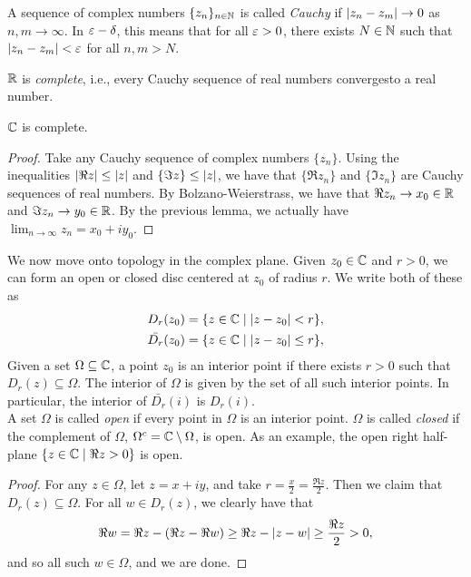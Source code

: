 \noindent A sequence of complex numbers $\{z_n\}_{n \in \mathbb N}$ is called \textit{Cauchy} if $\left\lvert z_n - z_m \right\rvert \to 0$ as $n, m \to \infty$. In $\varepsilon-\delta$, this means that for all $\varepsilon > 0$, there exists $N \in \mathbb N$ such that $\left\lvert z_n - z_m \right\rvert < \varepsilon$ for all $n, m > N$.
\begin{simplethm}
    $\mathbb R$ is \textit{complete}, i.e., every Cauchy sequence of real numbers convergesto a real number.
\end{simplethm}
\begin{simplethm}
    $\mathbb C$ is complete.
\end{simplethm}
\begin{proof}
    Take any Cauchy sequence of complex numbers $\{z_n\}$. Using the inequalities $\left\lvert \Re z \right\rvert \leq \left\lvert z \right\rvert$ and $\{\Im z\} \leq \left\lvert z \right\rvert$, we have that $\{\Re z_n\}$ and $\{\Im z_n\}$ are Cauchy sequences of real numbers. By Bolzano-Weierstrass, we have that $\Re z_n \to x_0 \in \mathbb R$ and $\Im z_n \to y_0 \in \mathbb R$. By the previous lemma, we actually have $\lim_{n \to \infty} z_n = x_0 + i y_0$.
\end{proof}
\noindent We now move onto topology in the complex plane. Given $z_0 \in \mathbb C$ and $r > 0$, we can form an open or closed disc centered at $z_0$ of radius $r$. We write both of these as
\begin{align*}
    D_r(z_0) &= \{z \in \mathbb C \mid \left\lvert z - z_0 \right\rvert < r\}, \\
    \bar{D_r}(z_0) &= \{z \in \mathbb C \mid \left\lvert z - z_0 \right\rvert \leq r\},
\end{align*}
Given a set $\Omega \subseteq \mathbb C$, a point $z_0$ is an interior point if there exists $r > 0$ such that $D_r(z) \subseteq \Omega$. The interior of $\Omega$ is given by the set of all such interior points. In particular, the interior of $\bar{D_r}(i)$ is $D_r(i)$.
\\[8pt]
A set $\Omega$ is called \textit{open} if every point in $\Omega$ is an interior point. $\Omega$ is called \textit{closed} if the complement of $\Omega$, $\Omega^c = \mathbb C \setminus \Omega$, is open. As an example, the open right half-plane $\{z \in \mathbb C \mid \Re z > 0\}$ is open.
\begin{proof}
    For any $z \in \Omega$, let $z = x + iy$, and take $r = \frac{x}{2} = \frac{\Re z}{2}$. Then we claim that $D_r(z) \subseteq \Omega$. For all $w \in D_r(z)$, we clearly have that
    \[ \Re w = \Re z - (\Re z - \Re w) \geq \Re z - \left\lvert z - w \right\rvert \geq \frac{\Re z}{2} > 0, \]
    and so all such $w \in \Omega$, and we are done. 
\end{proof}
